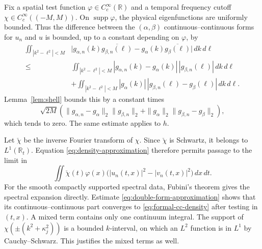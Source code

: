 \documentclass[11pt]{amsart}
\numberwithin{equation}{section}
\theoremstyle{remark}
\newcommand{\R}{\mathbb R}
\newcommand{\supp}{\operatorname{supp}}
\begin{document}
Fix a spatial test function $\varphi\in C_c^\infty(\R)$ and a temporal
frequency cutoff $\chi\in C_c^\infty((-M,M))$.  On $\supp\varphi$, the
physical eigenfunctions are uniformly bounded.  Thus the difference between
the $(\alpha,\beta)$ continuous--continuous forms for $u_n$ and $u$ is
bounded, up to a constant depending on $\varphi$, by
\begin{align*}
 \iint_{|k^2-\ell^2|<M}
 &\bigl|g_{\alpha,n}(k)\overline{g_{\beta,n}(\ell)}
       -g_\alpha(k)\overline{g_\beta(\ell)}\bigr|\,dk\,d\ell\\
 \le{}&\iint_{|k^2-\ell^2|<M}
 |g_{\alpha,n}(k)-g_\alpha(k)|\,|g_{\beta,n}(\ell)|\,dk\,d\ell\\
 &+\iint_{|k^2-\ell^2|<M}
 |g_\alpha(k)|\,|g_{\beta,n}(\ell)-g_\beta(\ell)|\,dk\,d\ell.
\end{align*}
Lemma~\ref{lem:shell} bounds this by a constant times
\begin{equation}
 \sqrt{2M}\left(
 \|g_{\alpha,n}-g_\alpha\|_2\|g_{\beta,n}\|_2
 +\|g_\alpha\|_2\|g_{\beta,n}-g_\beta\|_2
 \right),
 \label{eq:double-form-approximation}
\end{equation}
which tends to zero.  The same estimate applies to $h$.

Let $\check\chi$ be the inverse Fourier transform of $\chi$.  Since
$\check\chi$ is Schwartz, it belongs to $L^1(\R_t)$.  Equation
\eqref{eq:density-approximation} therefore permits passage to the limit in
\[
 \iint \check\chi(t)\varphi(x)
 \bigl(|u_n(t,x)|^2-|v_n(t,x)|^2\bigr)\,dx\,dt.
\]
For the smooth compactly supported spectral data, Fubini's theorem gives the
spectral expansion directly.  Estimate \eqref{eq:double-form-approximation}
shows that its continuous--continuous part converges to
\eqref{eq:formal-cc-density} after testing in $(t,x)$.  A mixed term contains
only one continuum integral.  The support of $\chi(\pm(k^2+\kappa_j^2))$ is a
bounded $k$-interval, on which an $L^2$ function is in $L^1$ by
Cauchy--Schwarz.  This justifies the mixed terms as well.
\end{document}
